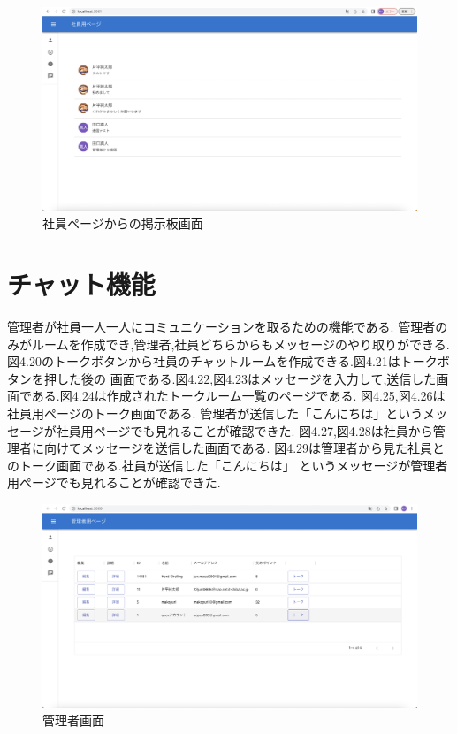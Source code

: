       \begin{figure}[!h]
        \begin{center}
          \includegraphics[scale=0.3, clip]{./img/sample19.png}
          \caption{社員ページからの掲示板画面}
          \label{fig:図の名前}
        \end{center}
        \end{figure}

\clearpage

\section{チャット機能}
管理者が社員一人一人にコミュニケーションを取るための機能である.
管理者のみがルームを作成でき,管理者,社員どちらからもメッセージのやり取りができる. \\
図4.20のトークボタンから社員のチャットルームを作成できる.図4.21はトークボタンを押した後の
画面である.図4.22,図4.23はメッセージを入力して,送信した画面である.図4.24は作成されたトークルーム一覧のページである.
図4.25,図4.26は社員用ページのトーク画面である.
管理者が送信した「こんにちは」というメッセージが社員用ページでも見れることが確認できた.
図4.27,図4.28は社員から管理者に向けてメッセージを送信した画面である.
図4.29は管理者から見た社員とのトーク画面である.社員が送信した「こんにちは」
というメッセージが管理者用ページでも見れることが確認できた.


\vspace{15mm}

\begin{figure}[!h]
  \begin{center}
    \includegraphics[scale=0.3, clip]{./img/chat1.png}
    \caption{管理者画面}
    \label{fig:図の名前}
  \end{center}
  \end{figure}

